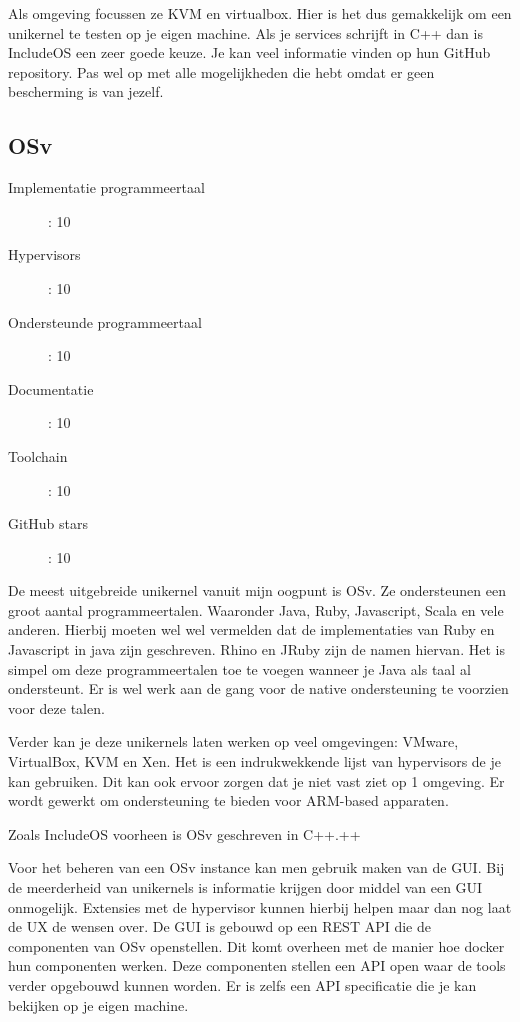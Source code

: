 \documentclass[pdftex,a4paper,12pt,twoside]{report}
\begin{document}
Als omgeving focussen ze KVM en virtualbox. Hier is het dus gemakkelijk om een unikernel te testen op je eigen machine. Als je services schrijft in C++ dan is IncludeOS een zeer goede keuze. Je kan veel informatie vinden op hun GitHub repository. Pas wel op met alle mogelijkheden die hebt omdat er geen bescherming is van jezelf.

\subsection{OSv}

\begin{description}
  \item [Implementatie programmeertaal]: 10
  \item [Hypervisors]: 10
  \item [Ondersteunde programmeertaal]: 10
  \item [Documentatie]: 10
  \item [Toolchain]: 10
  \item [GitHub stars]: 10
\end{description}

De meest uitgebreide unikernel vanuit mijn oogpunt is OSv. Ze ondersteunen een groot aantal programmeertalen. Waaronder Java, Ruby, Javascript, Scala en vele anderen. Hierbij moeten wel wel vermelden dat de implementaties van Ruby en Javascript in java zijn geschreven. Rhino en JRuby zijn de namen hiervan. Het is simpel om deze programmeertalen toe te voegen wanneer je Java als taal al ondersteunt. Er is wel werk aan de gang voor de native ondersteuning te voorzien voor deze talen.

Verder kan je deze unikernels laten werken op veel omgevingen: VMware, VirtualBox, KVM en Xen. Het is een indrukwekkende lijst van hypervisors de je kan gebruiken. Dit kan ook ervoor zorgen dat je niet vast ziet op 1 omgeving. Er wordt gewerkt om ondersteuning te bieden voor ARM-based apparaten.

Zoals IncludeOS voorheen is OSv geschreven in C++.++

Voor het beheren van een OSv instance kan men gebruik maken van de GUI. Bij de meerderheid van unikernels is informatie krijgen door middel van een GUI onmogelijk. Extensies met de hypervisor kunnen hierbij helpen maar dan nog laat de UX de wensen over. De GUI is gebouwd op een REST API die de componenten van OSv openstellen. Dit komt overheen met de manier hoe docker hun componenten werken. Deze componenten stellen een API open waar de tools verder opgebouwd kunnen worden. Er is zelfs een API specificatie die je kan bekijken op je eigen machine.
\end{document}
